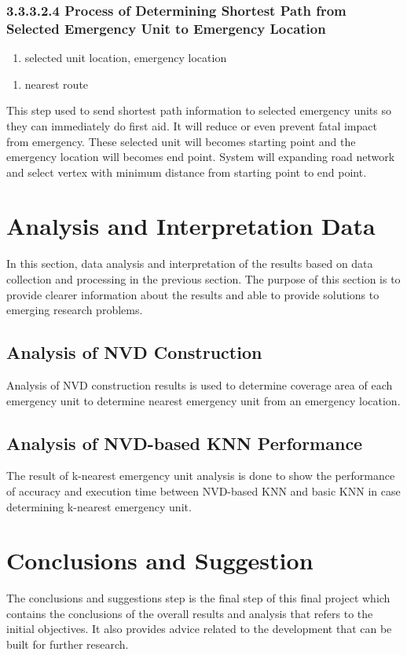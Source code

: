 \pagebreak
\subsubsection{3.3.3.2.4 Process of Determining Shortest Path from Selected Emergency Unit to Emergency Location}
\begin{enumerate}[label=Input\hspace{5mm} :\hspace{2mm}, leftmargin=*, topsep=0pt, itemsep=-1ex, parsep=1ex]
\item selected unit location, emergency location
\end{enumerate}
\begin{enumerate}[label=Output\hspace{2mm} :\hspace{2mm}, leftmargin=*, topsep=0pt, itemsep=-1ex, parsep=1ex]
\item nearest route
\end{enumerate}
This step used to send shortest path information to selected emergency units so they can immediately do first aid. It will reduce or even prevent fatal impact from emergency. These selected unit will becomes starting point and the emergency location will becomes end point. System will expanding road network and select vertex with minimum distance from starting point to end point.

\section{Analysis and Interpretation Data}
In this section, data analysis and interpretation of the results based on data collection and processing in the previous section. The purpose of this section is to provide clearer information about the results and able to provide solutions to emerging research problems.


\subsection{Analysis of NVD Construction}
Analysis of NVD construction results is used to determine coverage area of each emergency unit to determine nearest emergency unit from an emergency location.

\subsection{Analysis of NVD-based KNN Performance}
The result of k-nearest emergency unit analysis is done to show the performance of accuracy and execution time between NVD-based KNN and basic KNN in case determining k-nearest emergency unit.


\section{Conclusions and Suggestion}
The conclusions and suggestions step is the final step of this final project which contains the conclusions of the overall results and analysis that refers to the initial objectives. It also provides advice related to the development that can be built for further research.